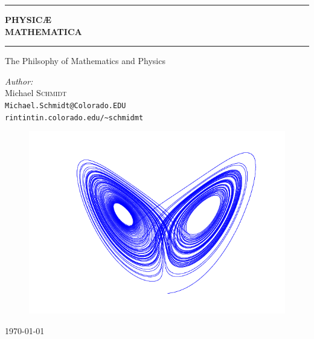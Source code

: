 \begin{titlepage}
\begin{center}
\hrule
{ \huge \bfseries PHYSIC\AE\\  MATHEMATICA}\\[0.5cm]
\hrule
The Philsophy of Mathematics and Physics

\emph{Author:}\\
Michael \textsc{Schmidt}\\
\texttt{Michael.Schmidt@Colorado.EDU}\\
\texttt{rintintin.colorado.edu/\~{}schmidmt}

\begin{figure}[!h]
	\centering
	\includegraphics[scale=0.60]{./attractor.png}
\end{figure}

\vfill
{\large \today}\\

\end{center}
\end{titlepage}
